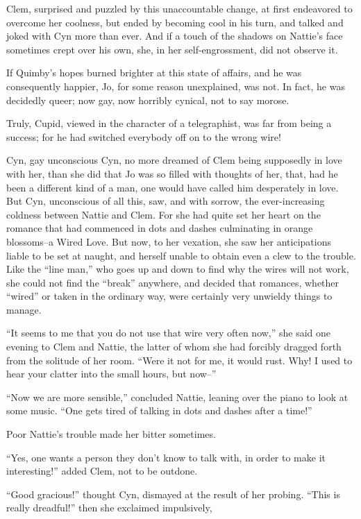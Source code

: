 Clem, surprised and puzzled by this unaccountable change, at first
endeavored to overcome her coolness, but ended by becoming cool in his
turn, and talked and joked with Cyn more than ever. And if a touch of
the shadows on Nattie's face sometimes crept over his own, she, in her
self-engrossment, did not observe it.

If Quimby's hopes burned brighter at this state of affairs, and he was
consequently happier, Jo, for some reason unexplained, was not. In fact,
he was decidedly queer; now gay, now horribly cynical, not to say
morose.

Truly, Cupid, viewed in the character of a telegraphist, was far from
being a success; for he had switched everybody off on to the wrong wire!

Cyn, gay unconscious Cyn, no more dreamed of Clem being supposedly in
love with her, than she did that Jo was so filled with thoughts of her,
that, had he been a different kind of a man, one would have called him
desperately in love. But Cyn, unconscious of all this, saw, and with
sorrow, the ever-increasing coldness between Nattie and Clem. For she
had quite set her heart on the romance that had commenced in dots and
dashes culminating in orange blossoms--a Wired Love. But now, to her
vexation, she saw her anticipations liable to be set at naught, and
herself unable to obtain even a clew to the trouble. Like the ``line
man,'' who goes up and down to find why the wires will not work, she
could not find the ``break'' anywhere, and decided that romances, whether
``wired'' or taken in the ordinary way, were certainly very unwieldy
things to manage.

``It seems to me that you do not use that wire very often now,'' she said
one evening to Clem and Nattie, the latter of whom she had forcibly
dragged forth from the solitude of her room. ``Were it not for me, it
would rust. Why! I used to hear your clatter into the small hours, but
now--''

``Now we are more sensible,'' concluded Nattie, leaning over the piano to
look at some music. ``One gets tired of talking in dots and dashes after
a time!''

Poor Nattie's trouble made her bitter sometimes.

``Yes, one wants a person they don't know to talk with, in order to make
it interesting!'' added Clem, not to be outdone.

``Good gracious!'' thought Cyn, dismayed at the result of her probing.
``This is really dreadful!'' then she exclaimed impulsively,

